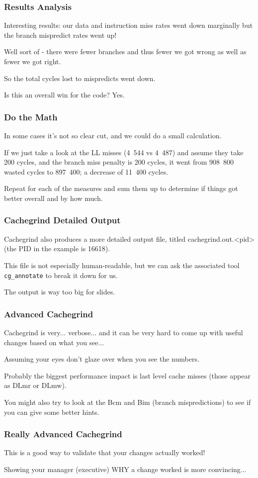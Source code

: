 \begin{frame}
\frametitle{Results Analysis}


Interesting results: our data and instruction miss rates went down marginally but the branch mispredict rates went up!

Well sort of - there were fewer branches and thus fewer we got wrong as well as fewer we got right. 

So the total cycles lost to mispredicts went down. 

Is this an overall win for the code? Yes. 


\end{frame}
\begin{frame}
\frametitle{Do the Math}

In some cases it's not so clear cut, and we could do a small calculation. 

If we just take a look at the LL misses (4~544 vs 4~487) and assume they take 200 cycles, and the branch miss penalty is 200 cycles, it went from 908~800 wasted cycles to 897~400; a decrease of 11~400 cycles.

  Repeat for each of the measures and sum them up to determine if things got better overall and by how much.

\end{frame}
\begin{frame}
\frametitle{Cachegrind Detailed Output}

Cachegrind also produces a more detailed output file, titled cachegrind.out.<pid> (the PID in the example is 16618). 

This file is not especially human-readable, but we can ask the associated tool \texttt{cg\_annotate} to break it down for us.

The output is way too big for slides.

\end{frame}
\begin{frame}
\frametitle{Advanced Cachegrind}

Cachegrind is very... verbose... and it can be very hard to come up with useful changes based on what you see... 

Assuming your eyes don't glaze over when you see the numbers. 

Probably the biggest performance impact is last level cache misses (those appear as DLmr or DLmw). 

You might also try to look at the Bcm and Bim (branch mispredictions) to see if you can give some better hints. 
\end{frame}
\begin{frame}
\frametitle{Really Advanced Cachegrind}

This is a good way to validate that your changes actually worked!

Showing your manager (executive) WHY a change worked is more convincing...

\end{frame}

